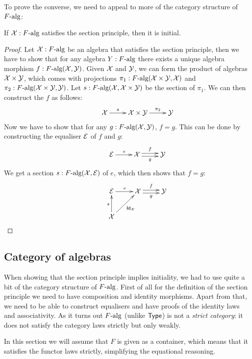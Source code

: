 \documentclass[a4paper,10pt]{article}
\begin{document}
To prove the converse, we need to appeal to more of the category
structure of $F\mbox{-alg}$:

\begin{prop}
  If $\mathcal{X} : F\mbox{-alg}$ satisfies the section principle, then it
  is initial.
\end{prop}

\begin{proof}
  Let $\mathcal{X} : F\mbox{-alg}$ be an algebra that satisfies the section
  principle, then we have to show that for any algebra
  $Y : F\mbox{-alg}$ there exists a unique algebra morphism
  $f : F\mbox{-alg}(\mathcal{X},\mathcal{Y})$. Given $\mathcal{X}$ and $\mathcal{Y}$, we
  can form the product of algebras $\mathcal{X} \times \mathcal{Y}$, which
  comes with projections
  $\pi_1 : F\mbox{-alg}(\mathcal{X} \times \mathcal{Y}, \mathcal{X})$ and
  $\pi_2 : F\mbox{-alg}(\mathcal{X} \times \mathcal{Y}, \mathcal{Y})$. Let
  $s : F\mbox{-alg}(\mathcal{X},\mathcal{X} \times \mathcal{Y})$ be the section of
  $\pi_1$. We can then construct the $f$ as follows:
$$
\xymatrix{ &\alg{X} \ar[r]^-{s} &\alg{X} \times \alg{Y}
  \ar[r]^-{\pi_2} &\alg{Y} }
$$
Now we have to show that for any $g : F\mbox{-alg}(\mathcal{X},\mathcal{Y})$,
$f = g$. This can be done by constructing the equaliser $\mathcal{E}$ of
$f$ and $g$:
$$
\xymatrix{ &\alg{E} \ar[r]^{e} &\alg{X} \ar@<-.5ex>[r]_-{g}
  \ar@<.5ex>[r]^-{f} &\alg{Y} }
$$
We get a section $s : F\mbox{-alg}(\mathcal{X},\mathcal{E})$ of $e$, which then
shows that $f = g$:
$$
\xymatrix{
  &\alg{E} \ar[r]^{e} &\alg{X} \ar@<-.5ex>[r]_-{g} \ar@<.5ex>[r]^-{f} &\alg{Y} \\
  &\alg{X} \ar[u]^{s} \ar[ur]_{\Id{\alg{X}}} }
$$
\end{proof}

\subsection{Category of algebras}
\label{sec:oitalgcat}

When showing that the section principle implies initiality, we had to
use quite a bit of the category structure of $F\mbox{-alg}$. First of
all for the definition of the section principle we need to have
composition and identity morphisms. Apart from that, we need to be
able to construct equalisers and have proofs of the identity laws and
associativity. As it turns out $F\mbox{-alg}$ (unlike $\mathsf{Type}$) is not a
\emph{strict category}: it does not satisfy the category laws strictly
but only weakly.

In this section we will assume that $F$ is given as a container, which
means that it satisfies the functor laws strictly, simplifying the
equational reasoning.
\end{document}
